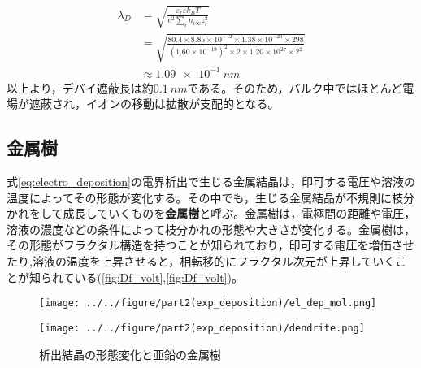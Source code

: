 \documentclass[autodetect-engine,dvi=dvipdfmx,a4paper,ja=standard,oneside,openany,11pt,draft]{bxjsbook}
\begin{document}
\begin{equation}
  \begin{split}
    \lambda_D & =\sqrt{\frac{\varepsilon_r\varepsilon k_BT}{e^2\sum_{i}n_{i\infty}z_i^2}}                                                                             \\
              & =\sqrt{\frac{80.4\times 8.85\times 10^{-12}\times 1.38\times 10^{-23}\times 298}{ (1.60\times 10^{-19})^2\times2\times 1.20\times 10^{27}\times 2^2}} \\
              & \approx \SI{1.09e-1}{nm}
  \end{split}
\end{equation}
以上より，デバイ遮蔽長は約$\SI{0.1}{nm}$である。そのため，バルク中ではほとんど電場が遮蔽され，イオンの移動は拡散が支配的となる。
\subsection{金属樹}
式\eqref{eq:electro_deposition}の電界析出で生じる金属結晶は，印可する電圧や溶液の温度によってその形態が変化する\cite{suda2003temperature}。その中でも，生じる金属結晶が不規則に枝分かれをして成長していくものを\textbf{金属樹}と呼ぶ。金属樹は，電極間の距離や電圧，溶液の濃度などの条件によって枝分かれの形態や大きさが変化する。金属樹は，その形態がフラクタル構造を持つことが知られており\cite{matsushita1984fractal}，印可する電圧を増価させたり\cite{matsushita1984fractal},溶液の温度を上昇させると\cite{suda2003temperature}，相転移的にフラクタル次元が上昇していくことが知られている(\ref{fig:Df_volt},\ref{fig:Df_volt})。
\begin{figure}[H]
  \begin{minipage}
    {0.65\textwidth}
    \centering
    \texttt{[image: ../../figure/part2(exp\_deposition)/el\_dep\_mol.png]}
    \label{fig:el_dep_mol}
  \end{minipage}
  \begin{minipage}
    {0.32\textwidth}
    \centering
    \texttt{[image: ../../figure/part2(exp\_deposition)/dendrite.png]}
    \label{fig:el_dep_fractal}
  \end{minipage}
  \caption{析出結晶の形態変化と亜鉛の金属樹}
\end{figure}
\end{document}
